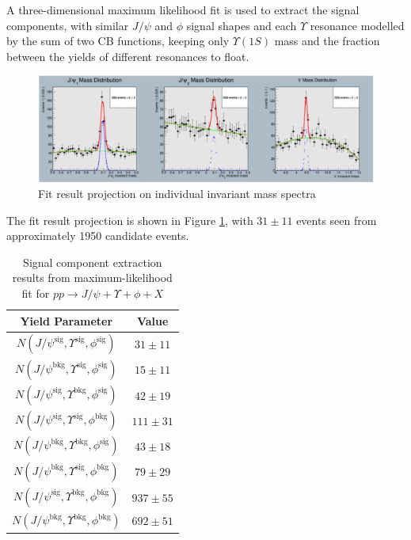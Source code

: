 \documentclass[10pt,twocolumn]{article}
\begin{document}
A three-dimensional maximum likelihood fit is used to extract the signal components, with similar $J/\psi$ and $\phi$ signal shapes and each $\Upsilon$ resonance modelled by the sum of two CB functions, keeping only $\Upsilon(1S)$ mass and the fraction between the yields of different resonances to float.

\begin{figure}
    \centering
    \includegraphics[width=1.0\linewidth]{images/JpsiJpsiY_fit.png}
    \caption{Fit result projection on individual invariant mass spectra}
    \label{fig:JpsiYPhi_fit}
\end{figure}

The fit result projection is shown in Figure  \ref{fig:JpsiYPhi_fit}, with $31 \pm 11$ events seen from approximately 1950 candidate events.

\begin{table}[]
    \centering
    \caption{Signal component extraction results from maximum-likelihood fit for $pp\to J/\psi+\Upsilon+\phi+X$\\}
    \begin{tabular}{cc}
        \toprule
        \textbf{Yield Parameter} & \textbf{Value} \\
        \midrule
        $N(J/\psi^{\text{sig}  },\Upsilon^{\text{sig} }, \phi^\text{sig})$ & $31 \pm 11$ \\
        $N(J/\psi^{\text{bkg}  },\Upsilon^{\text{sig} }, \phi^\text{sig})$ & $15 \pm 11$ \\
        $N(J/\psi^{\text{sig}  },\Upsilon^{\text{bkg} }, \phi^\text{sig})$ & $42 \pm 19$ \\
        $N(J/\psi^{\text{sig}  },\Upsilon^{\text{sig} }, \phi^\text{bkg})$ & $111 \pm 31$ \\
        $N(J/\psi^{\text{bkg}  },\Upsilon^{\text{bkg} }, \phi^\text{sig})$ & $43 \pm 18$ \\
        $N(J/\psi^{\text{bkg}  },\Upsilon^{\text{sig} }, \phi^\text{bkg})$ & $79 \pm 29$ \\
        $N(J/\psi^{\text{sig}  },\Upsilon^{\text{bkg} }, \phi^\text{bkg})$ & $937 \pm 55$ \\
        $N(J/\psi^{\text{bkg}  },\Upsilon^{\text{bkg} }, \phi^\text{bkg})$ & $692 \pm 51$ \\
        \bottomrule
    \end{tabular}
    \label{tab:fitres_JpsiYPhi}
\end{table}
\end{document}
